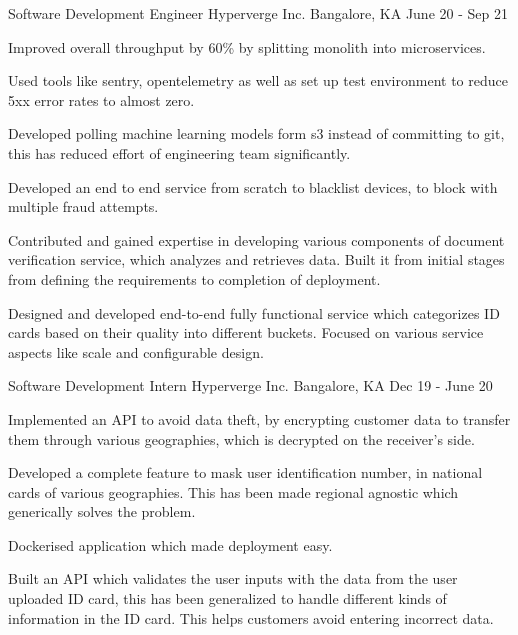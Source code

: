 \begin{cventries}
  \cventry
    {Software Development Engineer}
    {Hyperverge Inc.}
    {Bangalore, KA}
    {June 20 - Sep 21}
    {
      \begin{cvitems}
        \item {Improved overall throughput by 60\% by splitting monolith into microservices.}
        \item {Used tools like sentry, opentelemetry as well as set up test environment to reduce 5xx error rates to almost zero.}
        \item {Developed polling machine learning models form s3 instead of committing to git, this has reduced effort of engineering team significantly.}
        \item {Developed an end to end service from scratch to blacklist devices, to block with multiple fraud attempts.}
        \item {Contributed and gained expertise in developing various components of document verification service, which analyzes and retrieves data. Built it from initial stages from defining the requirements to completion of deployment.}
        \item {Designed and developed end-to-end fully functional service which categorizes ID cards based on their quality into different buckets. Focused on various service aspects like scale and configurable design.}
      \end{cvitems}
    }

  \cventry
    {Software Development Intern}
    {Hyperverge Inc.}
    {Bangalore, KA}
    {Dec 19 - June 20}
    {
      \begin{cvitems}
        \item {Implemented an API to avoid data theft, by encrypting customer data to transfer them through various geographies, which is decrypted on the receiver's side.}
        \item {Developed a complete feature to mask user identification number, in national cards of various geographies. This has been made regional agnostic which generically solves the problem.}
        \item {Dockerised application which made deployment easy.}
        \item {Built an API which validates the user inputs with the data from the user uploaded ID card, this has been generalized to handle different kinds of information in the ID card. This helps customers avoid entering incorrect data.}
      \end{cvitems}
    }

\end{cventries}
